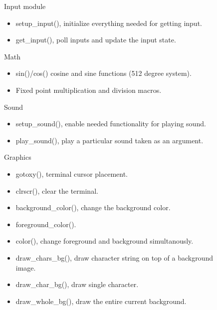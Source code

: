 \begin{figure}
	\center
	\begin{minipage}[t]{\columnwidth}
		\begin{minipage}[t]{0.3\linewidth}
			Input module
			\begin{itemize}
				\item setup\_input(), initialize everything needed for getting input.
				\item get\_input(), poll inputs and update the input state.
			\end{itemize}
		\end{minipage}
		\begin{minipage}[t]{0.3\linewidth}
			Math
			\begin{itemize}
				\item sin()/cos() cosine and sine functions (512 degree system).
				\item Fixed point multiplication and division macros.
			\end{itemize}
		\end{minipage}
		\begin{minipage}[t]{0.3\linewidth}
			Sound
			\begin{itemize}
				\item setup\_sound(), enable needed functionality for playing sound.
				\item play\_sound(), play a particular sound taken as an argument.
			\end{itemize}
		\end{minipage}
	\end{minipage}
	\vspace{1 cm}
	\begin{minipage}[b]{\columnwidth}
		\begin{minipage}[t]{0.5\linewidth}
			Graphics
			\begin{itemize}
				\item gotoxy(), terminal cursor placement.
				\item clrscr(), clear the terminal.
				\item background\_color(), change the background color.
				\item foreground\_color().
				\item color(), change foreground and background simultanously.
				\item draw\_chars\_bg(), draw character string on top of a background image.
				\item draw\_char\_bg(), draw single character.
				\item draw\_whole\_bg(), draw the entire current background.

\end{itemize}
\end{minipage}
\end{minipage}
\end{figure}
